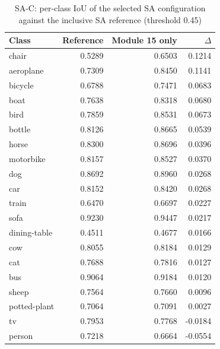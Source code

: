 \begin{table}[H]\centering\scriptsize\setlength{\tabcolsep}{3pt}
\begin{tabular}{>{\raggedright\arraybackslash}p{2.68cm}rrr}
\toprule
Class & Reference & Module 15 only & $\Delta$ \\
\midrule
chair & 0.5289 & 0.6503 & 0.1214 \\
aeroplane & 0.7309 & 0.8450 & 0.1141 \\
bicycle & 0.6788 & 0.7471 & 0.0683 \\
boat & 0.7638 & 0.8318 & 0.0680 \\
bird & 0.7859 & 0.8531 & 0.0673 \\
bottle & 0.8126 & 0.8665 & 0.0539 \\
horse & 0.8300 & 0.8696 & 0.0396 \\
motorbike & 0.8157 & 0.8527 & 0.0370 \\
dog & 0.8692 & 0.8960 & 0.0268 \\
car & 0.8152 & 0.8420 & 0.0268 \\
train & 0.6470 & 0.6697 & 0.0227 \\
sofa & 0.9230 & 0.9447 & 0.0217 \\
dining-table & 0.4511 & 0.4677 & 0.0166 \\
cow & 0.8055 & 0.8184 & 0.0129 \\
cat & 0.7688 & 0.7816 & 0.0127 \\
bus & 0.9064 & 0.9184 & 0.0120 \\
sheep & 0.7564 & 0.7660 & 0.0096 \\
potted-plant & 0.7064 & 0.7091 & 0.0027 \\
tv & 0.7953 & 0.7768 & -0.0184 \\
person & 0.7218 & 0.6664 & -0.0554 \\
\bottomrule
\end{tabular}
\caption{SA-C: per-class IoU of the selected SA configuration against the inclusive SA reference (threshold 0.45)}\label{tab:a6_sa_c_classes}
\end{table}
